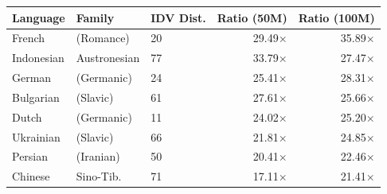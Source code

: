 \begin{tabular}{@{}lllrr@{}}
\toprule
Language & Family & IDV Dist. & Ratio (50M) & Ratio (100M) \\
\midrule
French       & (Romance)          &    20 &  29.49$\times$ &  35.89$\times$ \\
Indonesian   & Austronesian       &    77 &  33.79$\times$ &  27.47$\times$ \\
German       & (Germanic)         &    24 &  25.41$\times$ &  28.31$\times$ \\
Bulgarian    & (Slavic)           &    61 &  27.61$\times$ &  25.66$\times$ \\
Dutch        & (Germanic)         &    11 &  24.02$\times$ &  25.20$\times$ \\
Ukrainian    & (Slavic)           &    66 &  21.81$\times$ &  24.85$\times$ \\
Persian      & (Iranian)          &    50 &  20.41$\times$ &  22.46$\times$ \\
Chinese      & Sino-Tib.          &    71 &  17.11$\times$ &  21.41$\times$ \\
\bottomrule
\end{tabular}
